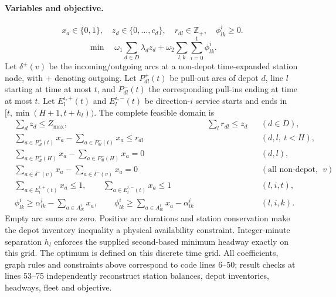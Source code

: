 \documentclass[11pt]{article}
\begin{document}
\paragraph{Variables and objective.}
\[
x_a\in\{0,1\},\quad
z_d\in\{0,\ldots,c_d\},\quad
r_{dl}\in\mathbb Z_+,\quad \phi^i_{lk}\ge0.
\]
\[
\min\quad
\omega_1\sum_{d\in D}\lambda_d z_d+
\omega_2\sum_{l,k}\sum_{i=0}^1\phi^i_{lk}.
\]
Let $\delta^\pm(v)$ be the incoming/outgoing arcs at a non-depot
time-expanded station node, with $+$ denoting outgoing.
Let $P^+_{dl}(t)$ be pull-out arcs of depot $d$, line $l$ starting
at time at most $t$, and $P^-_{dl}(t)$ the corresponding pull-ins
ending at time at most $t$. Let $E^{i,+}_{l}(t)$ and
$E^{i,-}_{l}(t)$ be direction-$i$ service starts and ends in
$[t,\min(H+1,t+h_l))$.
The complete feasible domain is
\begin{align}
&\sum_d z_d\le Z_{\max},&
&\sum_l r_{dl}\le z_d &&(d\in D),\\
&\sum_{a\in P^+_{dl}(t)}x_a-\sum_{a\in P^-_{dl}(t)}x_a
 \le r_{dl} &&&&(d,l,\ t<H),\\
&\sum_{a\in P^+_{dl}(H)}x_a-\sum_{a\in P^-_{dl}(H)}x_a=0
 &&&&(d,l),\\
&\sum_{a\in\delta^+(v)}x_a-\sum_{a\in\delta^-(v)}x_a=0
 &&&&(\text{all non-depot nodes }v),\\
&\sum_{a\in E^{i,+}_l(t)}x_a\le1,\qquad
 \sum_{a\in E^{i,-}_l(t)}x_a\le1 &&&&(l,i,t),\\
&\phi^i_{lk}\ge\alpha^i_{lk}-\sum_{a\in A^i_{lk}}x_a,\qquad
 \phi^i_{lk}\ge\sum_{a\in A^i_{lk}}x_a-\alpha^i_{lk}
 &&&&(l,i,k).
\end{align}
Empty arc sums are zero. Positive arc durations and station conservation
make the depot inventory inequality a physical availability constraint.
Integer-minute separation $h_l$ enforces the supplied second-based minimum
headway exactly on this grid. The optimum is defined on this discrete time grid.
All coefficients, graph rules and constraints above correspond to code
lines 6--50; result checks at lines 53--75 independently reconstruct
station balances, depot inventories, headways, fleet and objective.
\end{document}

